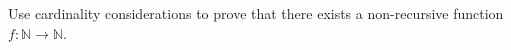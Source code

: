Use cardinality considerations to prove that there exists a non-recursive function $f: \mathbb{N} \to \mathbb{N}$.
